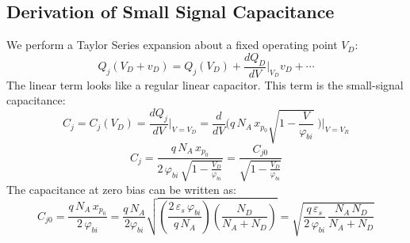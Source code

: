 \subsection{Derivation of Small Signal Capacitance}
We perform a Taylor Series expansion about a fixed operating point $V_D$:
    \begin{equation} 
        Q_j(V_D + v_D) = Q_j(V_D) + \frac{{dQ}_D}{dV} \bigg\rvert_{V_D}{v_D} + \cdots
    \end{equation}
The linear term looks like a regular linear capacitor.  This term is the small-signal capacitance:
    \begin{equation} 
        C_j = C_j(V_D) = \frac{{dQ}_j}{dV} \bigg\rvert_{V = V_D} = 
        \frac{d}{dV} \Bigg( q\,N_A\,x_{p_0} \sqrt{ 1 - \frac{V}{\varphi_{bi}} }\;\Bigg) \Bigg\rvert_{V = V_R}
    \end{equation}
    \begin{equation}
        C_j = \frac{q\,N_A\,x_{p_0}}{2\,\varphi_{bi}\,\sqrt{1 - \frac{V_D}{\varphi_{bi}} }} = 
        \frac{C_{j0}}{\sqrt{ 1 - \frac{V_D}{\varphi_{bi}} }} 
    \end{equation}
The capacitance at zero bias can be written as:
    \begin{equation} 
        C_{j0} = \frac{q\,N_A\,x_{p_0}}{2\,\varphi_{bi}} = 
        \frac{q\,N_A}{2\varphi_{bi}}\sqrt{ \left( \frac{2\,\varepsilon_s\,\varphi_{bi}}{q\,N_A} \right)
            \left( \frac{N_D}{N_A + N_D} \right)} =
            \sqrt{ \frac{q\,\varepsilon_s}{2\,\varphi_{bi}}\,\frac{N_A\,N_D}{N_A + N_D} }
        \label{eq:cj0}
    \end{equation}
